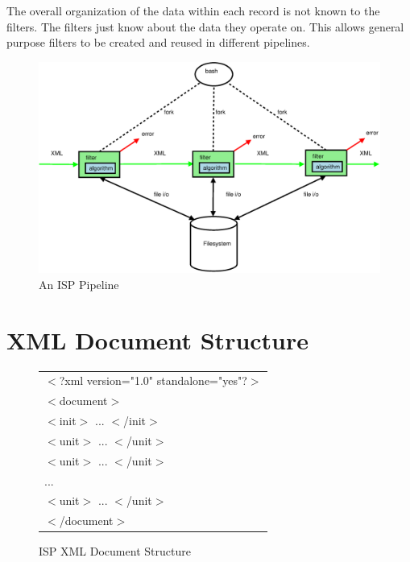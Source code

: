 \documentclass{article}
\begin{document}
The overall organization of the data within each record is not known 
to the filters.  The filters just know about the data they operate on.
This allows general purpose filters to be created and 
reused in different pipelines.


\begin{figure}
\begin{center}
 \includegraphics[width=\linewidth]{isp.eps}
\end{center}
\caption{An ISP Pipeline}\label{figschematic}
\end{figure}

\section{XML Document Structure}\label{secxml}

\begin{figure}
\begin{center}
\begin{tabular}{|l|}\hline
$<$?xml version="1.0" standalone="yes"?$>$\\
$<$document$>$\\
$<$init$>$ ... $<$/init$>$\\
$<$unit$>$ ... $<$/unit$>$\\
$<$unit$>$ ... $<$/unit$>$\\
...\\
$<$unit$>$ ... $<$/unit$>$\\
$<$/document$>$\\
\hline
\end{tabular}
\end{center}
\caption{ISP XML Document Structure}\label{figdocstruct}
\end{figure}
\end{document}
